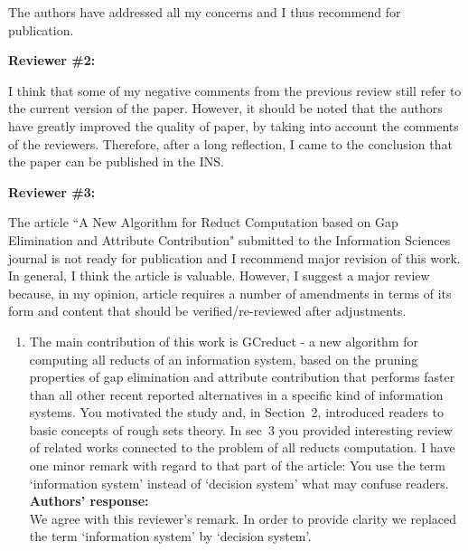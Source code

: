 \documentclass{letter}
\begin{document}
\begin{letter}{}
  The authors have addressed all my concerns and I thus recommend for publication.
  
  \textbf{Reviewer \#2:}
  
  I think that some of my negative comments from the previous review still refer to the current version of the paper. However, it should be noted that the authors have greatly improved the quality of paper, by taking into account the comments of the reviewers. Therefore, after a long reflection, I came to the conclusion that the paper can be published in the INS.
  
  \textbf{Reviewer \#3:}
  
  The article ``A New Algorithm for Reduct Computation based on Gap Elimination and Attribute Contribution" submitted to the Information Sciences journal is not ready for publication and I recommend major revision of this work. In general, I think the article is valuable. However, I suggest a major review because, in my opinion, article requires a number of amendments in terms of its form and content that should be verified/re-reviewed after adjustments.
 
 \begin{enumerate}  
	\item The main contribution of this work is GCreduct - a new algorithm for computing all reducts of an information system, based on the pruning properties of gap elimination and attribute contribution that performs faster than all other recent reported alternatives in a specific kind of information systems. You motivated the study and, in Section~2, introduced readers to basic concepts of rough sets theory. In sec~3 you provided interesting review of related works connected to the problem of all reducts computation. I have one minor remark with regard to that part of the article: You use the term `information system' instead of `decision system' what may confuse readers.\\
	\textbf{Authors’ response:} \\
	We agree with this reviewer's remark. In order to provide clarity we replaced the term `information system' by `decision system'.
	

\end{enumerate}
\end{letter}
\end{document}
